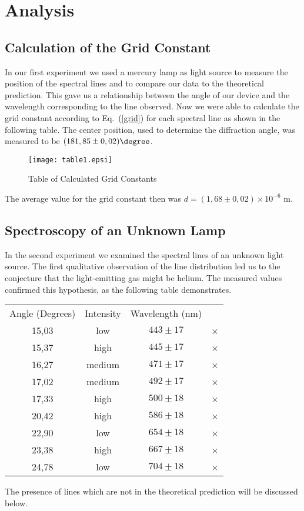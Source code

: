 \documentclass[a4paper,10pt]{article}
\begin{document}
\newpage



\section{Analysis}

\subsection{Calculation of the Grid Constant}
In our first experiment we used a mercury lamp as light source to measure the position of the spectral lines and to compare our data to the theoretical prediction. This gave us a relationship between the angle of our device and the wavelength corresponding to the line observed. Now we were able to calculate the grid constant according to Eq.~(\ref{grid}) for each spectral line as shown in the following table. The center position, used to determine the diffraction angle, was measured to be $(181,85 \pm 0,02) \degree$.
\begin{figure}[h]
	\centering
	\texttt{[image: table1.epsi]}
\caption{Table of Calculated Grid Constants}
\label{fig:1}
\end{figure}

The average value for the grid constant then was $d = (1,68 \pm 0,02) \times 10^{-6} \text{ m}$.

\subsection{Spectroscopy of an Unknown Lamp}
In the second experiment we examined the spectral lines of an unknown light source. The first qualitative observation of the line distribution led us to the conjecture that the light-emitting gas might be helium. The measured values confirmed this hypothesis, as the following table demonstrates.
\begin{center}
\newcommand{\mc}[3]{\multicolumn{#1}{#2}{#3}}
%
\begin{tabular}{cccc}
Angle (Degrees) & Intensity & Wavelength (nm) &  \\ 
15,03 & low & $443 \pm 17$ & × \\ 
15,37 & high & $445 \pm 17$ & × \\ 
16,27 & medium & $471 \pm 17$ & × \\ 
17,02 & medium & $492 \pm 17$ & × \\ 
17,33 & high & $500 \pm 18$ & × \\ 
20,42 & high & $586 \pm 18$ & × \\ 
22,90 & low & $654 \pm 18$ & × \\ 
23,38 & high & $667 \pm 18$ & × \\ 
24,78 & low & $704 \pm 18$ & ×
\end{tabular}
\end{center}
The presence of lines which are not in the theoretical prediction will be discussed below.
\end{document}
